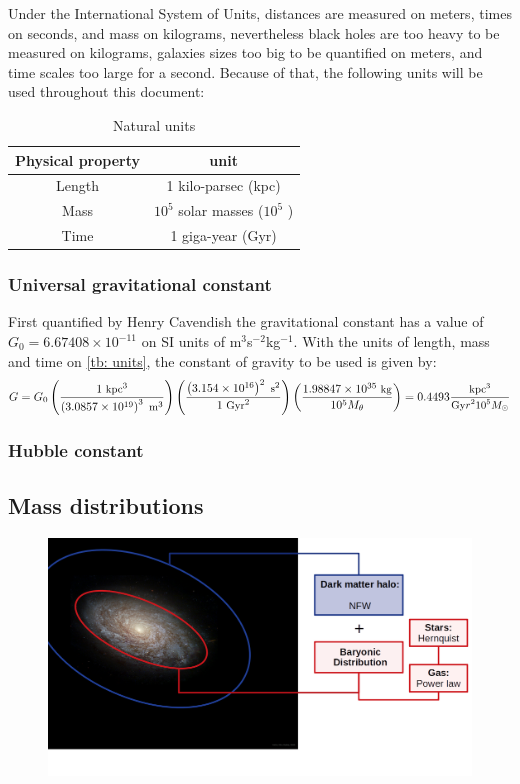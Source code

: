 		Under the International System of Units, distances are measured on meters, times on seconds, and mass on kilograms, nevertheless black holes are too heavy to be measured on kilograms, galaxies sizes too big to be quantified on meters, and time scales too large for a second. Because of that, the following units will be used throughout this document:
		\begin{table}[h]
			\centering
			\caption{Natural units}
			\label{tb: units}
			\begin{tabular}{c|c}
				\hline
				\textbf{Physical property} & \textbf{unit} \\
				\hline
				Length & 1 kilo-parsec (kpc) \\
				Mass & $10^5$ solar masses ($10^5$ \sm) \\
				Time & 1 giga-year (Gyr) \\
				\hline
			\end{tabular}
		\end{table}		
		
		\subsubsection{Universal gravitational constant}
			First quantified by Henry Cavendish the gravitational constant has a value of $G_0 = 6.67408\times10^{-11}$ on SI units of m$^3$s$^{-2}$kg$^{-1}$. With the units of length, mass and time on \autoref{tb: units}, the constant of gravity to be used is given by:
			\begin{equation}
				\small
				G = G_0 \left(\dfrac{1 \text{ kpc}^3}{\left(3.0857\times10^{19}\right)^3  \text{ m}^3}\right)\left(\dfrac{\left(3.154\times10^{16}\right)^2 \text{ s}^2}{1 \text{ Gyr}^2}\right)\left(\dfrac{1.98847\times10^{35} \text{ kg}}{10^5 M_\theta}\right) = 0.4493 \dfrac{\text{kpc$^3$}}{\text{Gy$r^210^5$$M_\odot$}}
			\end{equation}
			
		\subsubsection{Hubble constant}
		
	\subsection{Mass distributions}
		\begin{figure}[h]
			\centering
			\includegraphics[width=0.7\linewidth]{Figures/NGC4414_modified}
		\end{figure}
